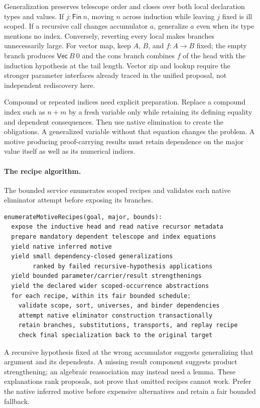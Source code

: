 Generalization preserves telescope order and closes over both local declaration
types and values. If $j:\mathsf{Fin}\ n$, moving $n$ across induction while
leaving $j$ fixed is ill scoped. If a recursive call changes accumulator $a$,
generalize $a$ even when its type mentions no index. Conversely, reverting
every local makes branches unnecessarily large. For vector map, keep $A$, $B$,
and $f:A\to B$ fixed; the empty branch produces $\mathsf{Vec}\ B\ 0$ and the
cons branch combines $f$ of the head with the induction hypothesis at the
tail length. Vector zip and lookup require the stronger parameter interfaces
already traced in the unified proposal, not independent rediscovery here.

Compound or repeated indices need explicit preparation. Replace a compound
index such as $n+m$ by a fresh variable only while retaining its defining
equality and dependent consequences. Then use native elimination to create
the obligations. A generalized variable without that equation changes the
problem. A motive producing proof-carrying results must retain dependence on
the major value itself as well as its numerical indices.

\paragraph{The recipe algorithm.}\label{sec:dependent-recipe}
The bounded service enumerates scoped recipes and validates each native
eliminator attempt before exposing its branches.
\begin{lstlisting}[caption={Bounded motive service; pseudocode.}]
enumerateMotiveRecipes(goal, major, bounds):
  expose the inductive head and read native recursor metadata
  prepare mandatory dependent telescope and index equations
  yield native inferred motive
  yield small dependency-closed generalizations
        ranked by failed recursive-hypothesis applications
  yield bounded parameter/carrier/result strengthenings
  yield the declared wider scoped-occurrence abstractions
  for each recipe, within its fair bounded schedule:
    validate scope, sort, universes, and binder dependencies
    attempt native eliminator construction transactionally
    retain branches, substitutions, transports, and replay recipe
    check final specialization back to the original target
\end{lstlisting}
A recursive hypothesis fixed at the wrong accumulator suggests generalizing
that argument and its dependents. A missing result component suggests product
strengthening; an algebraic reassociation may instead need a lemma.
These explanations rank proposals, not prove that omitted recipes cannot work.
Prefer the native inferred motive before expensive alternatives and retain a
fair bounded fallback.

